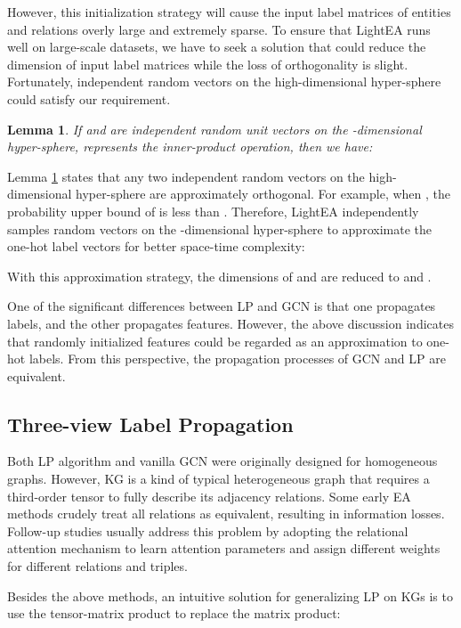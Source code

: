 \documentclass[11pt]{article}
\newtheorem{lemma}{Lemma}
\begin{document}
However, this initialization strategy will cause the input label matrices of entities and relations overly large and extremely sparse.
To ensure that LightEA runs well on large-scale datasets, we have to seek a solution that could reduce the dimension of input label matrices while the loss of orthogonality is slight.
Fortunately, independent random vectors on the high-dimensional hyper-sphere could satisfy our requirement.
\begin{lemma}
If  and  are independent random unit vectors on the -dimensional hyper-sphere,  represents the inner-product operation, then we have:

\label{lemma:1}
\end{lemma}

Lemma \ref{lemma:1} \cite{Ball1997AnEI} states that any two independent random vectors on the high-dimensional hyper-sphere are approximately orthogonal.
For example, when , the probability upper bound of  is less than .
Therefore, LightEA independently samples random vectors on the -dimensional hyper-sphere to approximate the one-hot label vectors for better space-time complexity:

With this approximation strategy, the dimensions of  and  are reduced to  and .

One of the significant differences between LP and GCN is that one propagates labels, and the other propagates features.
However, the above discussion indicates that randomly initialized features could be regarded as an approximation to one-hot labels.
From this perspective, the propagation processes of GCN and LP are equivalent.

\subsection{Three-view Label Propagation}
Both LP algorithm and vanilla GCN were originally designed for homogeneous graphs.
However, KG is a kind of typical heterogeneous graph that requires a third-order tensor  to fully describe its adjacency relations.
Some early EA methods \cite{DBLP:conf/emnlp/WangLLZ18,DBLP:conf/acl/XuWYFSWY19} crudely treat all relations as equivalent, resulting in information losses.
Follow-up studies usually address this problem by adopting the relational attention mechanism \cite{DBLP:conf/ijcai/WuLF0Y019,DBLP:conf/wsdm/MaoWXLW20} to learn attention parameters and assign different weights for different relations and triples.

Besides the above methods, an intuitive solution for generalizing LP on KGs is to use the tensor-matrix product to replace the matrix product:
\end{document}
